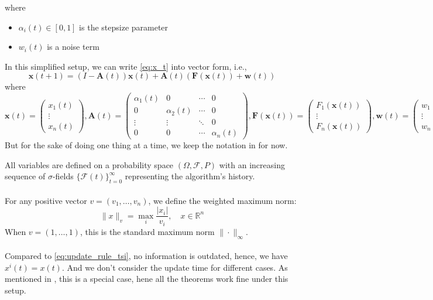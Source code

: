 where
\begin{itemize}
    \item $\alpha_i(t) \in [0,1]$ is the stepsize parameter
    \item $w_i(t)$ is a noise term
\end{itemize}
\begin{remark}
    In this simplified setup, we can write \autoref{eq:x_t} into vector form, i.e.,
    $$
    \mathbf{x}(t+1) =(I-\mathbf{A}(t)) \mathbf{x}(t) + \mathbf{A}(t)(\mathbf{F}(\mathbf{x}(t)) +\mathbf{w}(t))
    $$
    where
    $$
    \mathbf{x}(t) = \begin{pmatrix}
        x_1(t)\\
        \vdots\\
        x_n(t)
    \end{pmatrix},\mathbf{A}(t) = \begin{pmatrix}
        \alpha_1(t) & 0& \cdots & 0\\
        0& \alpha_2(t) & \cdots & 0\\
        \vdots & \vdots & \ddots & 0\\
        0 &0 &\cdots & \alpha_n(t)
    \end{pmatrix},\mathbf{F}(\mathbf{x}(t)) = \begin{pmatrix}
        F_1(\mathbf{x}(t))\\
        \vdots\\
        F_n(\mathbf{x}(t))
    \end{pmatrix},\mathbf{w}(t) = \begin{pmatrix}
        w_1(t)\\
        \vdots\\
        w_n(t)
    \end{pmatrix}
    $$
    But for the sake of doing one thing at a time, we keep the notation in \cite{tsitsiklis1994asynchronous} for now.
\end{remark}
All variables are defined on a probability space $(\Omega, \mathcal{F}, P)$ with an increasing sequence of $\sigma$-fields $\{\mathcal{F}(t)\}_{t=0}^{\infty}$ representing the algorithm's history. \\
\\
For any positive vector $v = (v_1, \ldots, v_n)$, we define the weighted maximum norm:
\begin{equation*}
\|x\|_v = \max_i \frac{|x_i|}{v_i}, \quad x \in \mathbb{R}^n
\end{equation*}
\noindent When $v = (1,\ldots,1)$, this is the standard maximum norm $\|\cdot\|_{\infty}$.\\
\\
\noindent Compared to \autoref{eq:update_rule_tsi}, no information is outdated, hence, we have $x^i(t) = x(t)$. And we don't consider the update time for different cases. As mentioned in \cite{tsitsiklis1994asynchronous}, this is a special case, hene all the theorems work fine under this setup.

